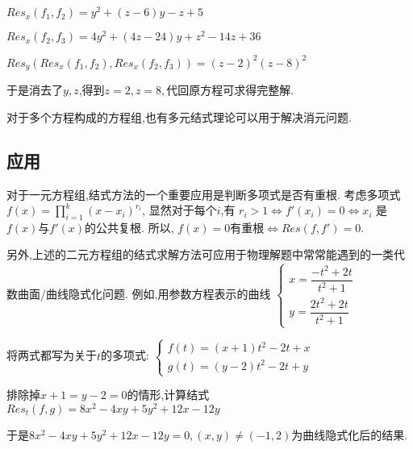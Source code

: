 	$ Res_x(f_1,f_2) = y^2+(z-6)y-z+5 $ 

	$ Res_x(f_2,f_3)=4y^2+(4z-24)y + z^2-14z+36$

	$ Res_y(Res_x(f_1,f_2),Res_x(f_2,f_3)) = (z-2)^2(z-8)^2$

	于是消去了$ y,z$,得到$ z=2,z=8,$代回原方程可求得完整解.

	对于多个方程构成的方程组,也有多元结式理论可以用于解决消元问题.\cite{ideals}

\subsection{应用}
	对于一元方程组,结式方法的一个重要应用是判断多项式是否有重根.
	考虑多项式$ f(x) = \prod_{i=1}^{k}{(x-x_i)^{r_i}}$,
	显然对于每个$ i$,有 $ r_i >1 \Leftrightarrow  f'(x_i) = 0 \Leftrightarrow x_i $ 是$f(x)$与$ f'(x)$的公共复根.
	所以, $ f(x)=0$有重根$ \Leftrightarrow Res(f,f')=0$.
	
	\vspace{5pt}
	另外,上述的二元方程组的结式求解方法可应用于物理解题中常常能遇到的一类代数曲面/曲线隐式化问题.
	例如,用参数方程表示的曲线
	$ \begin{cases}x=\dfrac{-t^2+2t}{t^2+1} \\ y=\dfrac{2t^2+2t}{t^2+1} \end{cases}$

	将两式都写为关于$ t$的多项式: 
	$\begin{cases}f(t)=(x+1)t^2 -2t +x\\ g(t)=(y-2)t^2-2t+y \end{cases}$

	排除掉$ x+1=y-2=0$的情形,计算结式$ Res_t(f,g)= 8x^2-4xy+5y^2+12x-12y$ 
	
	于是$8x^2-4xy+5y^2+12x-12y=0,(x,y) \ne (-1,2)$为曲线隐式化后的结果.
